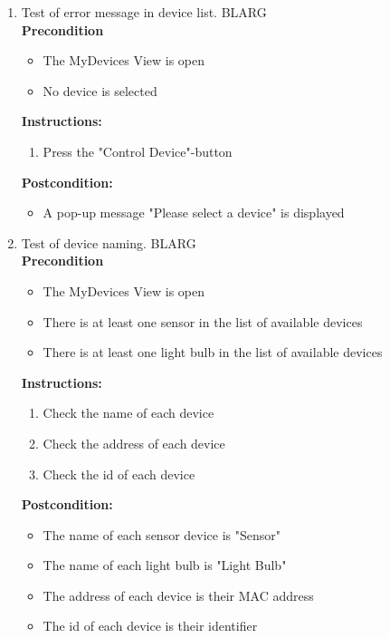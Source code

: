 \documentclass[a4paper]{article}
\newlength{\testlabellength}
\newenvironment{testlist}{\begin{enumerate}[label=\bfseries Instruction \thesubsection.\arabic* , labelindent=0pt, labelwidth=\testlabellength , leftmargin=2cm]}{\end{enumerate}}
\newenvironment{precondition}{
{\color{white}BLARG}\\ 
\textbf{Precondition}
\begin{itemize}[labelindent=0cm, labelwidth=2cm , leftmargin=1cm]
}
{\end{itemize}}
\newenvironment{instruction}{
\textbf{Instructions:}
\begin{enumerate}[label=\bfseries  \arabic*., labelindent=0cm, labelwidth=2cm , leftmargin=1cm]
}
{\end{enumerate}}
\newenvironment{postcondition}{
\textbf{Postcondition:}
\begin{itemize}[labelindent=0cm, labelwidth=2cm , leftmargin=1cm]
}
{\end{itemize}}
\begin{document}
\begin{appendices}
\begin{testlist}
    \item Test of error message in device list.
    	\begin{precondition}
    		\item The MyDevices View is open
    		\item No device is selected
    	\end{precondition}
    	\begin{instruction}
    		\item Press the "Control Device"-button
    	\end{instruction}
    	\begin{postcondition}
    		\item A pop-up message "Please select a device" is displayed
    	\end{postcondition}
   \newpage
	\item Test of device naming. \label{MyDevicesTest2}
		\begin{precondition}
			\item The MyDevices View is open
			\item There is at least one sensor in the list of available devices
			\item There is at least one light bulb in the list of available devices
		\end{precondition}
		\begin{instruction}
			\item Check the name of each device
			\item Check the address of each device
			\item Check the id of each device
		\end{instruction}
		\begin{postcondition}
			\item The name of each sensor device is "Sensor"
			\item The name of each light bulb is "Light Bulb"
			\item The address of each device is their MAC address
			\item The id of each device is their identifier
		\end{postcondition}
		   
   

\end{testlist}
\end{appendices}
\end{document}
